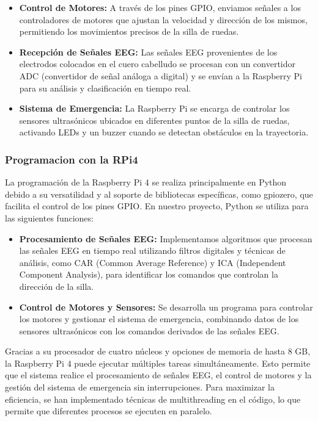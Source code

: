 \documentclass{article}
\begin{document}
\begin{itemize}
    \item \textbf{Control de Motores:} A través de los pines GPIO, enviamos señales a los controladores de motores que ajustan la velocidad y dirección de los mismos, permitiendo los movimientos precisos de la silla de ruedas.
    \item \textbf{Recepción de Señales EEG:} Las señales EEG provenientes de los electrodos colocados en el cuero cabelludo se procesan con un convertidor ADC (convertidor de señal análoga a digital) y se envían a la Raspberry Pi para su análisis y clasificación en tiempo real.
    \item \textbf{Sistema de Emergencia:} La Raspberry Pi se encarga de controlar los sensores ultrasónicos ubicados en diferentes puntos de la silla de ruedas, activando LEDs y un buzzer cuando se detectan obstáculos en la trayectoria.
\end{itemize}

\subsubsection{Programacion con la RPi4}
La programación de la Raspberry Pi 4 se realiza principalmente en Python debido a su versatilidad y al soporte de bibliotecas específicas, como gpiozero, que facilita el control de los pines GPIO. En nuestro proyecto, Python se utiliza para las siguientes funciones:
\begin{itemize}
    \item \textbf{Procesamiento de Señales EEG:} Implementamos algoritmos que procesan las señales EEG en tiempo real utilizando filtros digitales y técnicas de análisis, como CAR (Common Average Reference) y ICA (Independent Component Analysis), para identificar los comandos que controlan la dirección de la silla.
    \item \textbf{Control de Motores y Sensores:} Se desarrolla un programa para controlar los motores y gestionar el sistema de emergencia, combinando datos de los sensores ultrasónicos con los comandos derivados de las señales EEG.
\end{itemize}
Gracias a su procesador de cuatro núcleos y opciones de memoria de hasta 8 GB, la Raspberry Pi 4 puede ejecutar múltiples tareas simultáneamente. Esto permite que el sistema realice el procesamiento de señales EEG, el control de motores y la gestión del sistema de emergencia sin interrupciones. Para maximizar la eficiencia, se han implementado técnicas de multithreading en el código, lo que permite que diferentes procesos se ejecuten en paralelo.
\end{document}
